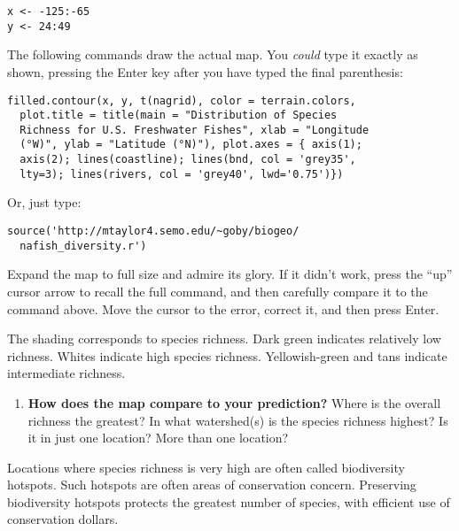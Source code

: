 \documentclass[11pt]{article}
\begin{document}
\begin{verbatim}
x <- -125:-65
y <- 24:49
\end{verbatim}


The following commands draw the actual map. You \emph{could} type it exactly as
shown, pressing the Enter key after you have typed the final parenthesis:


\begin{verbatim}
filled.contour(x, y, t(nagrid), color = terrain.colors, 
  plot.title = title(main = "Distribution of Species 
  Richness for U.S. Freshwater Fishes", xlab = "Longitude 
  (°W)", ylab = "Latitude (°N)"), plot.axes = { axis(1);
  axis(2); lines(coastline); lines(bnd, col = 'grey35', 
  lty=3); lines(rivers, col = 'grey40', lwd='0.75')})
\end{verbatim}

Or, just type:

\begin{verbatim}
source('http://mtaylor4.semo.edu/~goby/biogeo/
  nafish_diversity.r')
\end{verbatim}

Expand the map to full size and admire its glory. If it didn't work, 
press the ``up'' cursor arrow to recall the full command, and then 
carefully compare it to the command above. Move the cursor to 
the error, correct it, and then press Enter.

The shading corresponds to species richness. Dark green indicates
relatively low richness. Whites indicate high species richness.
Yellowish-green and tans indicate intermediate richness.

\begin{enumerate}[resume, leftmargin=*]
\item \textbf{How does the map compare to your prediction?} Where is the overall
richness the greatest? In what watershed(s) is the species richness
highest? Is it in just one location? More than one location?\vspace{10\baselineskip}
\end{enumerate}

Locations where species richness is very high are often called
biodiversity hotspots. Such hotspots are often areas of conservation
concern. Preserving biodiversity hotspots protects the greatest number
of species, with efficient use of conservation dollars.
\end{document}
